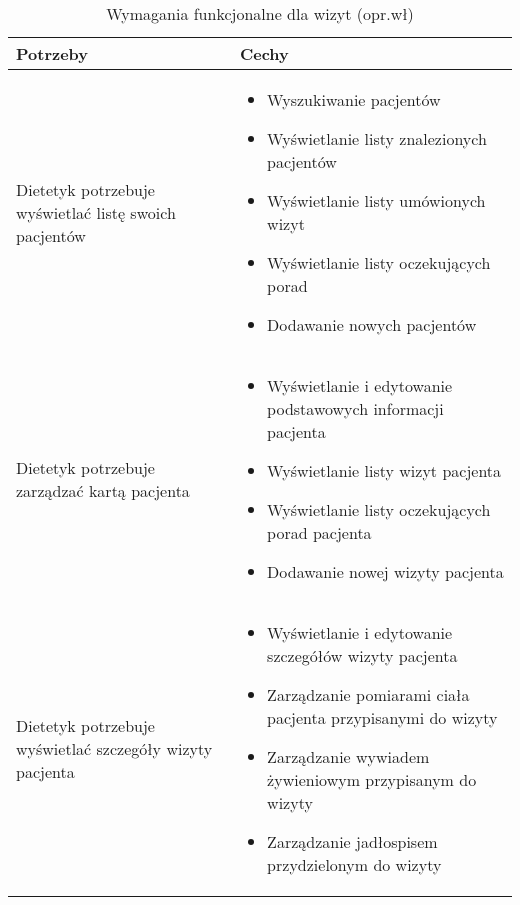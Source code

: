\begin{minipage}{\textwidth}
    \begin{table}[H]
        \centering\caption{Wymagania funkcjonalne dla wizyt (opr.wł)\label{tabela:wymaganiaFunkcjonalneWizyty}}
        \begin{tabular}{|p{}|p{}|}
            \hline
            Potrzeby & Cechy \\

            \hline
            Dietetyk potrzebuje wyświetlać listę swoich pacjentów &
            \begin{itemize}
                \item Wyszukiwanie pacjentów
                \item Wyświetlanie listy znalezionych pacjentów
                \item Wyświetlanie listy umówionych wizyt
                \item Wyświetlanie listy oczekujących porad
                \item Dodawanie nowych pacjentów
            \end{itemize} \\
            \hline
            Dietetyk potrzebuje zarządzać kartą pacjenta &
            \begin{itemize}
                \item Wyświetlanie i edytowanie podstawowych informacji pacjenta
                \item Wyświetlanie listy wizyt pacjenta
                \item Wyświetlanie listy oczekujących porad pacjenta
                \item Dodawanie nowej wizyty pacjenta
            \end{itemize} \\
            \hline
            Dietetyk potrzebuje wyświetlać szczegóły wizyty pacjenta &
            \begin{itemize}
                \item Wyświetlanie i edytowanie szczegółów wizyty pacjenta
                \item Zarządzanie pomiarami ciała pacjenta przypisanymi do wizyty
                \item Zarządzanie wywiadem żywieniowym przypisanym do wizyty
                \item Zarządzanie jadłospisem przydzielonym do wizyty
            \end{itemize} \\

\end{tabular}
\end{table}
\end{minipage}
